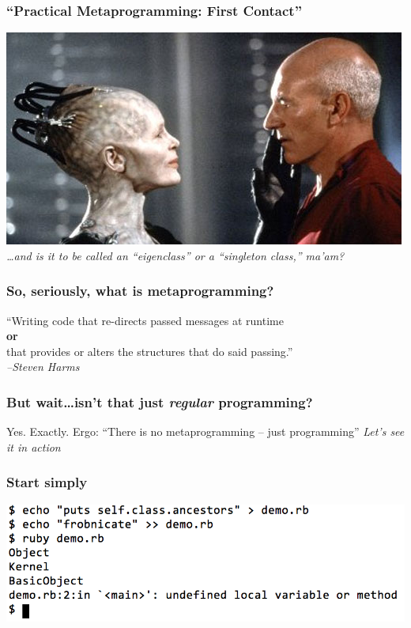 \documentclass[slidestop,compress,mathserif]{beamer}
\begin{document}
\begin{frame}
	\frametitle{``Practical Metaprogramming:  First Contact''}
	\includegraphics[scale=0.55]{img/first_contact.jpg} \\
	\emph{\ldots and is it to be called an ``eigenclass'' or a ``singleton class,'' ma'am?}
\end{frame}
\note{
	\begin{itemize}
		\item 
	\end{itemize}
}

\begin{frame}
	\frametitle{So, seriously, what \textbf{is} metaprogramming?}
	\begin{center}
		\pause
		``Writing code that re-directs passed messages at runtime \\ \textbf{or} \\
that provides or alters the structures that do said passing.''
		\pause
		\emph{\\ --Steven Harms}
	\end{center}
\end{frame}
\note{}

\begin{frame}
	\frametitle{But wait{\ldots}isn't that just \emph{regular} programming?}
	\begin{center}
		Yes.  Exactly.  Ergo:  ``There is no metaprogramming -- just programming''
		\pause
		\vskip 0.25cm
		\emph{Let's see it in action}
	\end{center}
\end{frame}

\begin{frame}
	\frametitle{Start simply}
		\begin{center}
			\includegraphics[scale=0.35]{img/undefined_method_chain.png}
		\end{center}
\end{frame}
\end{document}
